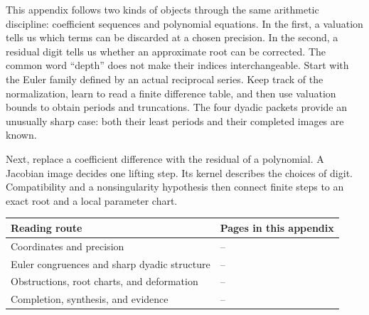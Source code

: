 This appendix follows two kinds of objects through the same arithmetic discipline: coefficient sequences and polynomial equations. In the first, a valuation tells us which terms can be discarded at a chosen precision. In the second, a residual digit tells us whether an approximate root can be corrected. The common word ``depth'' does not make their indices interchangeable.
Start with the Euler family defined by an actual reciprocal series. Keep track of the normalization, learn to read a finite difference table, and then use valuation bounds to obtain periods and truncations. The four dyadic packets provide an unusually sharp case: both their least periods and their completed images are known.

Next, replace a coefficient difference with the residual of a polynomial. A Jacobian image decides one lifting step. Its kernel describes the choices of digit. Compatibility and a nonsingularity hypothesis then connect finite steps to an exact root and a local parameter chart.
\par
\begin{tabularx}{\linewidth}{@{}lY@{}}\toprule
Reading route & Pages in this appendix\\\midrule
Coordinates and precision & --\\
Euler congruences and sharp dyadic structure & --\\
Obstructions, root charts, and deformation & --\\
Completion, synthesis, and evidence & --\\\bottomrule
\end{tabularx}
\par
{}

